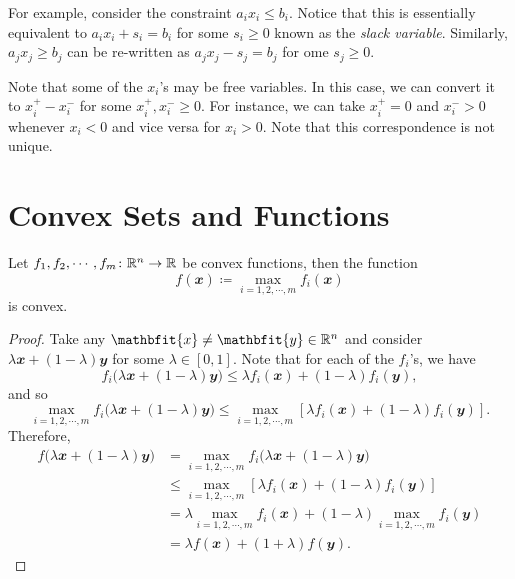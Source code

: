 \documentclass[math, code]{amznotes}
\theoremstyle{remark}
\begin{document}
For example, consider the constraint $a_ix_i \leq b_i$. Notice that this is essentially equivalent to $a_ix_i + s_i = b_i$ for some $s_i \geq 0$ known as the \textit{slack variable}. Similarly, $a_jx_j \geq b_j$ can be re-written as $a_jx_j - s_j = b_j$ for ome $s_j \geq 0$.

Note that some of the $x_i$'s may be free variables. In this case, we can convert it to $x_i^+ - x_i^-$ for some $x_i^+, x_i^- \geq 0$. For instance, we can take $x_i^+ = 0$ and $x_i^- > 0$ whenever $x_i < 0$ and vice versa for $x_i > 0$. Note that this correspondence is not unique.
\section{Convex Sets and Functions}
\begin{probox}{}{}
    Let $f_1, f_2, \cdots, f_m \colon \mathbb{R}^n \to \mathbb{R}$ be convex functions, then the function
    \begin{equation*}
        f(\mathbfit{x}) \coloneqq \max_{i = 1, 2, \cdots, m}f_i(\mathbfit{x})
    \end{equation*}
    is convex.
    \tcblower
    \begin{proof}
        Take any $\mathbfit{x} \neq \mathbfit{y} \in \R^n$ and consider $\lambda\mathbfit{x} + (1 - \lambda)\mathbfit{y}$ for some $\lambda \in [0, 1]$. Note that for each of the $f_i$'s, we have
        \begin{equation*}
            f_i\bigl(\lambda\mathbfit{x} + (1 - \lambda)\mathbfit{y}\bigr) \leq \lambda f_i(\mathbfit{x}) + (1 - \lambda)f_i(\mathbfit{y}),
        \end{equation*}
        and so
        \begin{equation*}
            \max_{i = 1, 2, \cdots, m}f_i\bigl(\lambda\mathbfit{x} + (1 - \lambda)\mathbfit{y}\bigr) \leq \max_{i = 1, 2, \cdots, m}\left[\lambda f_i(\mathbfit{x}) + (1 - \lambda)f_i(\mathbfit{y})\right].
        \end{equation*}
        Therefore,
        \begin{align*}
            f\bigl(\lambda\mathbfit{x} + (1 - \lambda)\mathbfit{y}\bigr) & = \max_{i = 1, 2, \cdots, m}f_i\bigl(\lambda\mathbfit{x} + (1 - \lambda)\mathbfit{y}\bigr) \\
            & \leq \max_{i = 1, 2, \cdots, m}\left[\lambda f_i(\mathbfit{x}) + (1 - \lambda)f_i(\mathbfit{y})\right] \\
            & = \lambda\max_{i = 1, 2, \cdots, m}f_i(\mathbfit{x}) + (1 - \lambda)\max_{i = 1, 2, \cdots, m}f_i(\mathbfit{y}) \\
            & = \lambda f(\mathbfit{x}) + (1 + \lambda)f(\mathbfit{y}).
        \end{align*}
    \end{proof}
\end{probox}
\end{document}
